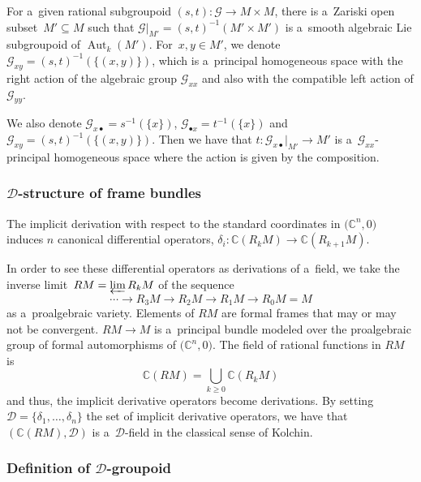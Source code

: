 \documentclass[10pt,a4paper]{amsart}
\numberwithin{equation}{section}
\theoremstyle{definition}
\begin{document}
For a~given rational subgroupoid $(s,t)\colon \mathcal G\to M\times M$, there is a~Zariski open subset~${M'\subseteq M}$ such that $\mathcal G|_{M'} = (s,t)^{-1}(M'\times M')$ is a~smooth algebraic Lie subgroupoid of $\operatorname{Aut}_k(M')$. For~${x,y\in M'}$, we denote $\mathcal G_{xy} = (s,t)^{-1}(\{(x,y)\})$, which is a~principal homogeneous space with the right action of the algebraic group $\mathcal G_{xx}$ and also with the compatible left action of $\mathcal G_{yy}$.

We also denote $\mathcal G_{x \bullet} = s^{-1}(\{x\})$, $\mathcal G_{\bullet x} = t^{-1}(\{x\})$ and $\mathcal G_{xy} = (s,t)^{-1}(\{(x,y)\})$. Then we have that $t\colon \mathcal G_{x\bullet}|_{M'}\to M'$ is a~$\mathcal G_{xx}$-principal homogeneous space where the action is given by the composition.

\subsubsection[D-structure of frame bundles]{$\boldsymbol{\mathcal D}$-structure of frame bundles}

The implicit derivation with respect to the standard coordinates in $\bigl(\mathbb C^n,0\bigr)$ induces $n$ canonical differential operators,
$\delta_i \colon \mathbb C(R_kM) \to \mathbb C(R_{k+1}M)$.

In order to see these differential operators as derivations of a~field, we take the inverse limit~${RM = \varprojlim R_kM}$ of the sequence
\[\cdots \to R_3M \to R_2M \to R_1M \to R_0M=M\]
as a~proalgebraic variety. Elements of $RM$ are formal frames that may or may not be convergent. $RM\to M$ is a~principal bundle modeled over the proalgebraic group
 of formal automorphisms of $\bigl(\mathbb C^n,0\bigr)$. The field of rational functions in $RM$ is
\[\mathbb C(RM) = \bigcup_{k\geq 0} \mathbb C(R_kM)\]
and thus, the implicit derivative operators become derivations. By setting $\mathcal D = \{\delta_1,\dots,\delta_n\}$ the set of implicit derivative operators, we have that $(\mathbb C(RM), \mathcal D)$ is a~$\mathcal D$-field in the classical sense of Kolchin.

\subsubsection[Definition of D-groupoid]{Definition of $\boldsymbol{\mathcal D}$-groupoid}
\end{document}
